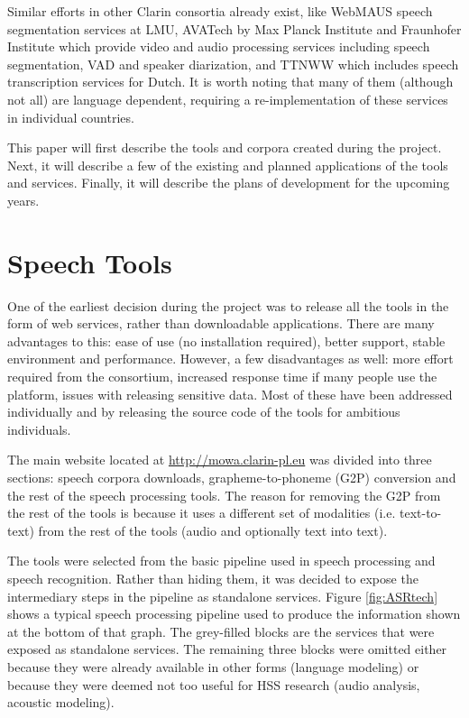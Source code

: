 \documentclass[a4paper,11pt]{article}
\begin{document}
Similar efforts in other Clarin consortia already exist, like WebMAUS \cite{kisler2016} speech segmentation services at LMU, AVATech \cite{lenkiewicz2012avatech} by Max Planck Institute and Fraunhofer Institute which provide video and audio processing services including speech segmentation, VAD and speaker diarization, and TTNWW \cite{clarinnl-ttnww} which includes speech transcription services for Dutch. It is worth noting that many of them (although not all) are language dependent, requiring a re-implementation of these services in individual countries.

This paper will first describe the tools and corpora created during the project. Next, it will describe a few of the existing and planned applications of the tools and services. Finally, it will describe the plans of development for the upcoming years.

\section{Speech Tools}

One of the earliest decision during the project was to release all the tools in the form of web services, rather than downloadable applications. There are many advantages to this: ease of use (no installation required), better support, stable environment and performance. However, a few disadvantages as well: more effort required from the consortium, increased response time if many people use the platform, issues with releasing sensitive data. Most of these have been addressed individually and by releasing the source code of the tools for ambitious individuals.

The main website located at \url{http://mowa.clarin-pl.eu} was divided into three sections: speech corpora downloads, grapheme-to-phoneme (G2P) conversion and the rest of the speech processing tools. The reason for removing the G2P from the rest of the tools is because it uses a different set of modalities (i.e. text-to-text) from the rest of the tools (audio and optionally text into text).

The tools were selected from the basic pipeline used in speech processing and speech recognition. Rather than hiding them, it was decided to expose the intermediary steps in the pipeline as standalone services. Figure \ref{fig:ASRtech} shows a typical speech processing pipeline used to produce the information shown at the bottom of that graph. The grey-filled blocks are the services that were exposed as standalone services. The remaining three blocks were omitted either because they were already available in other forms (language modeling) or because they were deemed not too useful for HSS research (audio analysis, acoustic modeling).
\end{document}
